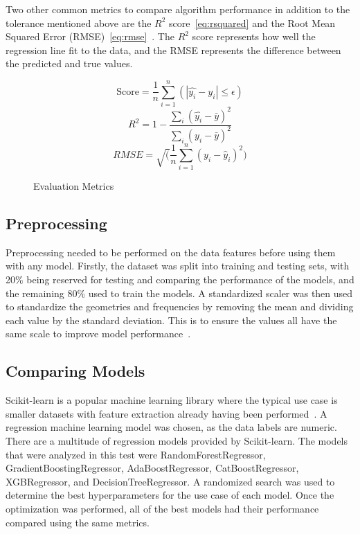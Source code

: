 \documentclass[conference]{IEEEtran}
\begin{document}
Two other common metrics to compare algorithm performance in addition to the tolerance mentioned above are the $R^2$ score~\eqref{eq:rsquared} and the Root Mean Squared Error (RMSE)~\eqref{eq:rmse}~\cite{shcherbakov_survey_2013}. The $R^2$ score represents how well the regression line fit to the data, and the RMSE represents the difference between the predicted and true values.

\begin{figure}[h]
    \begin{equation}
        \text{Score} = \frac{1}{n} \sum_{i=1}^{n}(\left|\hat{y_i} - y_i\right| \leq \epsilon)
        \label{eq:tolerance}
    \end{equation}
    \begin{equation}
        R^2 = 1 - \frac{\sum_{i}(\hat{y_i} - \bar{y})^2}{\sum_{i}(y_i - \bar{y})^2}
        \label{eq:rsquared}
    \end{equation}
    \begin{equation}
        {RMSE} = \sqrt(\frac{1}{n} \sum_{i=1}^{n}(y_i - \hat{y}_i)^2)
        \label{eq:rmse}
    \end{equation}
    \caption{Evaluation Metrics}
\end{figure}


\subsection{Preprocessing}
Preprocessing needed to be performed on the data features before using them with any model. Firstly, the dataset was split into training and testing sets, with 20\% being reserved for testing and comparing the performance of the models, and the remaining 80\% used to train the models. A standardized scaler was then used to standardize the geometries and frequencies by removing the mean and dividing each value by the standard deviation. This is to ensure the values all have the same scale to improve model performance~\cite{9119820}. 


\subsection{Comparing Models}
Scikit-learn is a popular machine learning library where the typical use case is smaller datasets with feature extraction already having been performed~\cite{scikit-learn}. A regression machine learning model was chosen, as the data labels are numeric. There are a multitude of regression models provided by Scikit-learn. The models that were analyzed in this test were RandomForestRegressor, GradientBoostingRegressor, AdaBoostRegressor, CatBoostRegressor, XGBRegressor, and DecisionTreeRegressor. A randomized search was used to determine the best hyperparameters for the use case of each model. Once the optimization was performed, all of the best models had their performance compared using the same metrics. 
\end{document}
